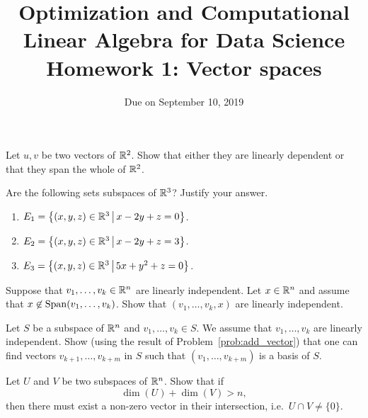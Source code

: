 \documentclass[11pt,nocut]{article}
\title{\vspace{-2.0cm}%
	Optimization and Computational Linear Algebra for Data Science\\
Homework 1: Vector spaces}
\date{\vspace{-1cm}Due on September 10, 2019}
\begin{document}
\maketitle



\begin{problem}[2 points]
	Let $u,v$ be two vectors of $\mathbb{R}^2$. Show that either they are linearly dependent or that they span the whole of $\mathbb{R}^2$.
\end{problem}

\vspace{1mm}

\begin{problem}[3 points]
	Are the following sets subspaces of $\mathbb{R}^3$? Justify your answer.
	\begin{enumerate}[label=\normalfont(\textbf{\alph*})]
		\item $E_1= \big\{ (x,y,z) \in \mathbb{R}^3 \, \big| \, x - 2y + z= 0 \big\}$.
		\item $E_2= \big\{ (x,y,z) \in \mathbb{R}^3 \, \big| \, x - 2y + z= 3 \big\}$.
		\item $E_3= \big\{ (x,y,z) \in \mathbb{R}^3 \, \big| \, 5x + y^2 + z= 0 \big\}$.
	\end{enumerate}
\end{problem}

\vspace{1mm}

\begin{problem}[3 points]\label{prob:add_vector}
	Suppose that $v_1, \dots, v_k \in \mathbb{R}^n$ are linearly independent. Let $x \in \mathbb{R}^n$ and assume that $x \not\in {{\rm Span}}(v_1,\dots, v_k)$.
	Show that $(v_1,\dots,v_k,x)$ are linearly independent.
\end{problem}

\vspace{1mm}

\begin{problem}[2 points]
	Let $S$ be a subspace of $\mathbb{R}^n$ and $v_1, \dots, v_k \in S$.
	We assume that $v_1, \dots, v_k$ are linearly independent.
	Show (using the result of Problem~\ref{prob:add_vector}) that one can find vectors $v_{k+1}, \dots, v_{k+m}$ in $S$ such that $(v_1, \dots, v_{k+m})$ is a basis of $S$.
\end{problem}

\vspace{1mm}

\begin{problem}[$\star$]
	Let $U$ and $V$ be two subspaces of $\mathbb{R}^n$. Show that if
	$$
	\dim(U) + \dim(V) > n,
	$$
	then there must exist a non-zero vector in their intersection, i.e.\ $U \cap V \neq \{0\}$.
\end{problem}
\vspace{1cm}
\centerline{}

%
%
\end{document}
